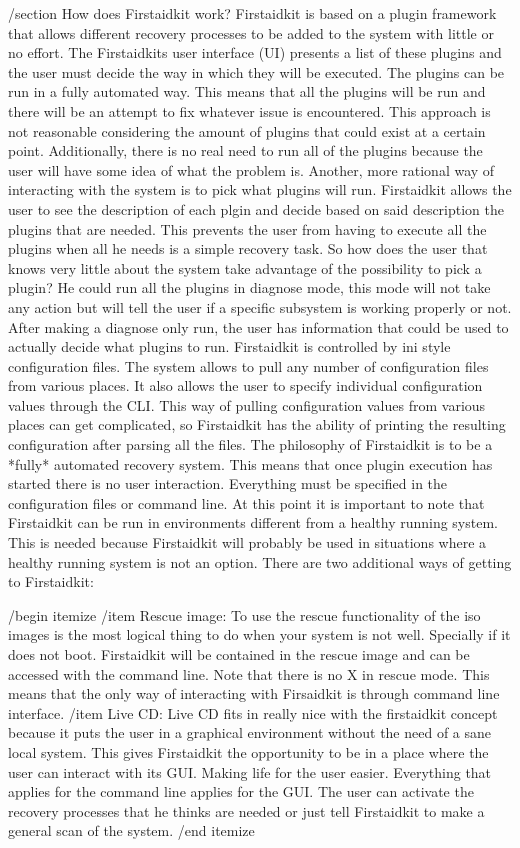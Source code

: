 /section{ How does Firstaidkit work? }
Firstaidkit is based on a plugin framework that allows different recovery processes to be added to the system with little or no effort.  The Firstaidkits user interface (UI) presents a list of these plugins and the user must decide the way in which they will be executed.  The plugins can be run in a fully automated way.  This means that all the plugins will be run and there will be an attempt to fix whatever issue is encountered.  This approach is not reasonable considering the amount of plugins that could exist at a certain point.  Additionally, there is no real need to run all of the plugins because the user will have some idea of what the problem is.
Another, more rational way of interacting with the system is to pick what plugins will run.  Firstaidkit allows the user to see the description of each plgin and decide based on said description the plugins that are needed.  This prevents the user from having to execute all the plugins when all he needs is a simple recovery task.
So how does the user that knows very little about the system take advantage of the possibility to pick a plugin?  He could run all the plugins in diagnose mode, this mode will not take any action but will tell the user if a specific subsystem is working properly or not.  After making a diagnose only run, the user has information that could be used to actually decide what plugins to run.
Firstaidkit is controlled by ini style configuration files.  The system allows to pull any number of configuration files from various places.  It also allows the user to specify individual configuration values through the CLI.  This way of pulling configuration values from various places can get complicated, so Firstaidkit has the ability of printing the resulting configuration after parsing all the files.
The philosophy of Firstaidkit is to be a *fully* automated recovery system.  This means that once plugin execution has started there is no user interaction.  Everything must be specified in the configuration files or command line.
At this point it is important to note that Firstaidkit can be run in environments different from a healthy running system.  This is needed because Firstaidkit will probably be used in situations where a healthy running system is not an option.  There are two additional ways of getting to Firstaidkit:

/begin{ itemize }
/item Rescue image:
To use the rescue functionality of the iso images is the most logical thing to do when your system is not well.  Specially if it does not boot.  Firstaidkit will be contained in the rescue image and can be accessed with the command line.  Note that there is no X in rescue mode.  This means that the only way of interacting with Firsaidkit is through command line interface.
/item Live CD:
Live CD fits in really nice with the firstaidkit concept because it puts the user in a graphical environment without the need of a sane local system.  This gives Firstaidkit the opportunity to be in a place where the user can interact with its GUI.  Making life for the user easier.  Everything that applies for the command line applies for the GUI.  The user can activate the recovery processes that he thinks are needed or just tell Firstaidkit to make a general scan of the system.
/end { itemize }

